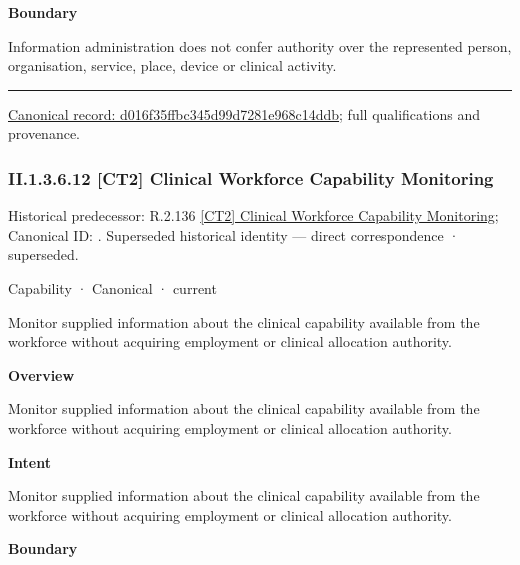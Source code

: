 \textbf{Boundary}



Information administration does not confer authority over the represented person, organisation, service, place, device or clinical activity.



\medskip\hrule\medskip

{\footnotesize \href{../../../../continuum/strategy/capability/d016f35ffbc345d99d7281e968c14ddb.md}{Canonical record: d016f35ffbc345d99d7281e968c14ddb}; full qualifications and provenance.}\par
\subsubsection*{II.1.3.6.12 [CT2] Clinical Workforce Capability Monitoring}
\label{navigation:II.1.3.6.12}

{\small Historical predecessor: R.2.136 \hyperref[element:24c015676c254e2e82e8e4287c295179]{[CT2] Clinical Workforce Capability Monitoring}; Canonical ID: \texttt{}. Superseded historical identity — direct correspondence · superseded.}\par
\label{element:367b3e5643f44fa785f093db8bb9a6e8}
{\small Capability · Canonical · current}\par

Monitor supplied information about the clinical capability available from the workforce without acquiring employment or clinical allocation authority.



\textbf{Overview}



Monitor supplied information about the clinical capability available from the workforce without acquiring employment or clinical allocation authority.



\textbf{Intent}



Monitor supplied information about the clinical capability available from the workforce without acquiring employment or clinical allocation authority.



\textbf{Boundary}



